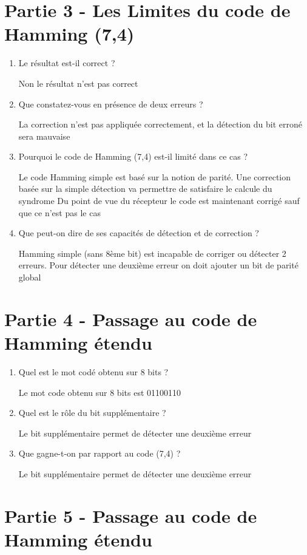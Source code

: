 \documentclass{article}
\begin{document}
\section{Partie 3 - Les Limites du code de Hamming (7,4)}
\begin{enumerate}
\item Le résultat est-il correct ? 

Non le résultat n'est pas correct
\item Que constatez-vous en présence de deux erreurs ? 

La correction n'est pas appliquée correctement, et la détection du bit erroné sera mauvaise
\item Pourquoi le code de Hamming (7,4) est-il limité dans ce cas ? 

Le code Hamming simple est basé sur la notion de parité.
Une correction basée sur la simple détection va permettre de satisfaire le calcule du syndrome
Du point de vue du récepteur le code est maintenant corrigé sauf que ce n'est pas le cas

\item Que peut-on dire de ses capacités de détection et de correction ? 

Hamming simple (sans 8ème bit) est incapable de corriger ou détecter 2 erreurs.
Pour détecter une deuxième erreur on doit ajouter un bit de parité global
\end{enumerate}

\section{Partie 4 - Passage au code de Hamming étendu}
\begin{enumerate}
\item Quel est le mot codé obtenu sur 8 bits ? 

Le mot code obtenu sur 8 bits est 01100110
\item Quel est le rôle du bit supplémentaire ? 

Le bit supplémentaire permet de détecter une deuxième erreur
\item Que gagne-t-on par rapport au code (7,4) ? 

Le bit supplémentaire permet de détecter une deuxième erreur
\end{enumerate}

\section{Partie 5 - Passage au code de Hamming étendu}
\end{document}

